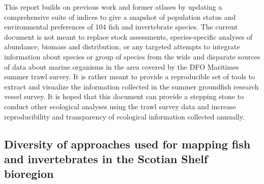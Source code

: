 \documentclass[12pt]{article}\usepackage[]{graphicx}\usepackage[]{color}
\begin{document}
This report builds on previous work and former atlases by updating a comprehensive suite of indices to give a snapshot of population status and environmental preferences of 104 fish and invertebrate species. The current document is not meant to replace stock assessments, species-specific analyses of abundance, biomass and distribution, or any targeted attempts to integrate information about species or group of species from the wide and disparate sources of data about marine organisms in the area covered by the DFO Maritimes summer trawl survey. It is rather meant to provide a reproducible set of tools to extract and visualize the information collected in the summer groundfish research vessel survey. It is hoped that this document can provide a stepping stone to conduct other ecological analyses using the trawl survey data and increase reproducibility and transparency of ecological information collected annually.

\hypertarget{diversity-of-approaches-used-for-mapping-fish-and-invertebrates-in-the-scotian-shelf-bioregion}{%
\subsection{Diversity of approaches used for mapping fish and invertebrates in the Scotian Shelf bioregion}\label{diversity-of-approaches-used-for-mapping-fish-and-invertebrates-in-the-scotian-shelf-bioregion}}
\end{document}
